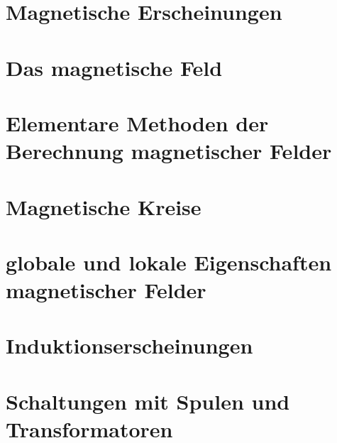 \documentclass[12pt,a4paper,twoside]{book}
\begin{document}

\chapter{Magnetische Erscheinungen}


\chapter{Das magnetische Feld}


\chapter{Elementare Methoden der Berechnung magnetischer Felder}


\chapter{Magnetische Kreise}


\chapter{globale und lokale Eigenschaften magnetischer Felder}


\chapter{Induktionserscheinungen}


\chapter{Schaltungen mit Spulen und Transformatoren}
\end{document}

